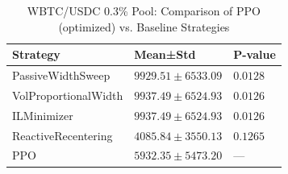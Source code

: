 \begin{table}
\caption{WBTC/USDC 0.3\% Pool: Comparison of PPO (optimized) vs. Baseline Strategies}
\label{tab:baseline_comparison_wbtc}
\begin{tabular}{lll}
\toprule
Strategy & Mean±Std & P-value \\
\midrule
PassiveWidthSweep & $9929.51 \pm 6533.09$ & $0.0128$ \\
VolProportionalWidth & $9937.49 \pm 6524.93$ & $0.0126$ \\
ILMinimizer & $9937.49 \pm 6524.93$ & $0.0126$ \\
ReactiveRecentering & $4085.84 \pm 3550.13$ & $0.1265$ \\
PPO & $5932.35 \pm 5473.20$ & — \\
\bottomrule
\end{tabular}
\end{table}
